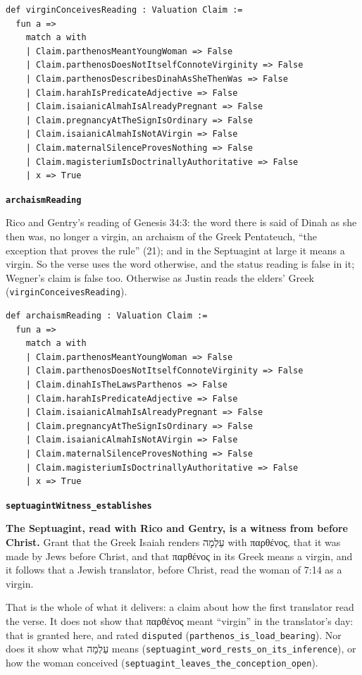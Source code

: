 \documentclass[11pt]{article}
\begin{document}
{\small\begin{verbatim}
def virginConceivesReading : Valuation Claim :=
  fun a =>
    match a with
    | Claim.parthenosMeantYoungWoman => False
    | Claim.parthenosDoesNotItselfConnoteVirginity => False
    | Claim.parthenosDescribesDinahAsSheThenWas => False
    | Claim.harahIsPredicateAdjective => False
    | Claim.isaianicAlmahIsAlreadyPregnant => False
    | Claim.pregnancyAtTheSignIsOrdinary => False
    | Claim.isaianicAlmahIsNotAVirgin => False
    | Claim.maternalSilenceProvesNothing => False
    | Claim.magisteriumIsDoctrinallyAuthoritative => False
    | x => True
\end{verbatim}}
\par\medskip\noindent\textbf{\texttt{archaism\allowbreak{}Reading}}\par\nobreak\noindent
Rico and Gentry’s reading of Genesis 34:3: the word there is said of Dinah as she then was, no longer a virgin, an archaism of the Greek Pentateuch, “the exception that proves the rule” (21); and in the Septuagint at large it means a virgin. So the verse uses the word otherwise, and the status reading is false in it; Wegner’s claim is false too. Otherwise as Justin reads the elders’ Greek (\texttt{virgin\allowbreak{}Conceives\allowbreak{}Reading}).

{\small\begin{verbatim}
def archaismReading : Valuation Claim :=
  fun a =>
    match a with
    | Claim.parthenosMeantYoungWoman => False
    | Claim.parthenosDoesNotItselfConnoteVirginity => False
    | Claim.dinahIsTheLawsParthenos => False
    | Claim.harahIsPredicateAdjective => False
    | Claim.isaianicAlmahIsAlreadyPregnant => False
    | Claim.pregnancyAtTheSignIsOrdinary => False
    | Claim.isaianicAlmahIsNotAVirgin => False
    | Claim.maternalSilenceProvesNothing => False
    | Claim.magisteriumIsDoctrinallyAuthoritative => False
    | x => True
\end{verbatim}}
\par\medskip\noindent\textbf{\texttt{septuagint\allowbreak{}Witness\_\allowbreak{}establishes}}\par\nobreak\noindent
\textbf{The Septuagint, read with Rico and Gentry, is a witness from before Christ.} Grant that the Greek Isaiah renders עַלְמָה with παρθένος, that it was made by Jews before Christ, and that παρθένος in its Greek means a virgin, and it follows that a Jewish translator, before Christ, read the woman of 7:14 as a virgin.

That is the whole of what it delivers: a claim about how the first translator read the verse. It does not show that παρθένος meant “virgin” in the translator’s day: that is granted here, and rated \texttt{disputed} (\texttt{parthenos\_\allowbreak{}is\_\allowbreak{}load\_\allowbreak{}bearing}). Nor does it show what עַלְמָה means (\texttt{septuagint\_\allowbreak{}word\_\allowbreak{}rests\_\allowbreak{}on\_\allowbreak{}its\_\allowbreak{}inference}), or how the woman conceived (\texttt{septuagint\_\allowbreak{}leaves\_\allowbreak{}the\_\allowbreak{}conception\_\allowbreak{}open}).
\end{document}
